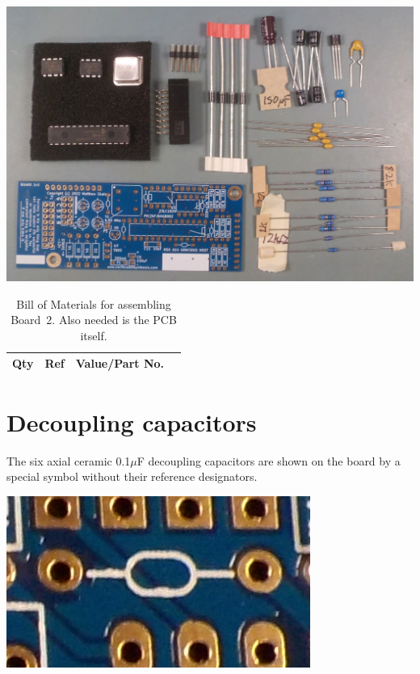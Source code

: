 \nopagebreak
\noindent\includegraphics[width=\linewidth]{board2-parts.jpg}

\begin{table}
{\centering
{}
\vspace{\baselineskip}

\begin{tabular}{rp{1.3in}cp{3in}}
  \textbf{Qty} & \textbf{Ref} & \textbf{Value/Part No.} & \\ \hline

\end{tabular}\par}
\caption{Bill of Materials for assembling Board~2.  Also needed is the PCB
itself.}\label{tab:b2bom}
\end{table}

\section{Decoupling capacitors}

The six axial ceramic 0.1$\mu$F decoupling capacitors are shown
on the board by a special symbol without their reference designators.

\nopagebreak
\noindent\includegraphics[width=\linewidth]{decoup-symbol.jpg}

